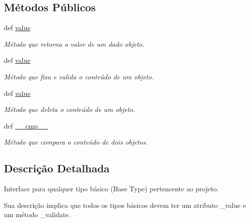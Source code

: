 \subsection*{Métodos Públicos}
\begin{DoxyCompactItemize}
\item 
def \hyperlink{classELO_1_1BaseUnit_1_1IfBaseType_ae4974528321f9314afd17c3da0e9d676}{value}
\begin{DoxyCompactList}\small\item\em Método que retorna o valor de um dado objeto. \end{DoxyCompactList}\item 
def \hyperlink{classELO_1_1BaseUnit_1_1IfBaseType_ae4974528321f9314afd17c3da0e9d676}{value}
\begin{DoxyCompactList}\small\item\em Método que fixa e valida o conteúdo de um objeto. \end{DoxyCompactList}\item 
def \hyperlink{classELO_1_1BaseUnit_1_1IfBaseType_ae4974528321f9314afd17c3da0e9d676}{value}
\begin{DoxyCompactList}\small\item\em Método que deleta o conteúdo de um objeto. \end{DoxyCompactList}\item 
def \hyperlink{classELO_1_1BaseUnit_1_1IfBaseType_a69c338f6f1574bd3524e9d59ebc17a7c}{\-\_\-\-\_\-cmp\-\_\-\-\_\-}
\begin{DoxyCompactList}\small\item\em Método que compara o conteúdo de dois objetos. \end{DoxyCompactList}\end{DoxyCompactItemize}


\subsection{Descrição Detalhada}
Interface para qualquer tipo básico (Base Type) pertencente ao projeto. 

Sua descrição implica que todos os tipos básicos devem ter um atributo \-\_\-value e um método \-\_\-validate. 

